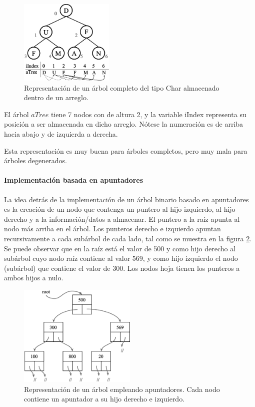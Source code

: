 \begin{figure}[htpb!]
  \begin{center}
    \includegraphics[width=0.4\textwidth]{images/vectorbinTree.eps}
  \end{center}
  \caption{Representación de un árbol completo del tipo Char almacenado dentro de un arreglo.}
  \label{fig:vectorbinTree}
\end{figure}

El árbol $aTree$ tiene 7 nodos con de altura 2, y la variable iIndex representa su posición a ser almacenada en dicho arreglo. Nótese la numeración es de arriba hacia abajo y de izquierda a derecha.

Esta representación es muy buena para árboles completos, pero muy mala para árboles degenerados.

\paragraph{Implementación basada en apuntadores}

La idea detrás de la implementación de un árbol binario basado en apuntadores es la creación de un nodo que contenga un puntero al hijo izquierdo, al hijo derecho y a la información/datos a almacenar. El puntero a la raíz apunta al nodo más arriba en el árbol. Los punteros derecho e izquierdo apuntan recursivamente a cada subárbol de cada lado, tal como se muestra en la figura \ref{fig:BTPointer}. Se puede observar que en la raíz está el valor de 500 y como hijo derecho al subárbol cuyo nodo raíz contiene al valor 569, y como hijo izquierdo el nodo (subárbol) que contiene el valor de 300. Los nodos hoja tienen los punteros a ambos hijos a nulo.

\begin{figure}[htpb!]
  \begin{center}
    \includegraphics[width=0.5\textwidth]{images/BTPointer.eps}
  \end{center}
  \caption{Representación de un árbol empleando apuntadores. Cada nodo contiene un apuntador a su hijo derecho e izquierdo.}
  \label{fig:BTPointer}
\end{figure}

